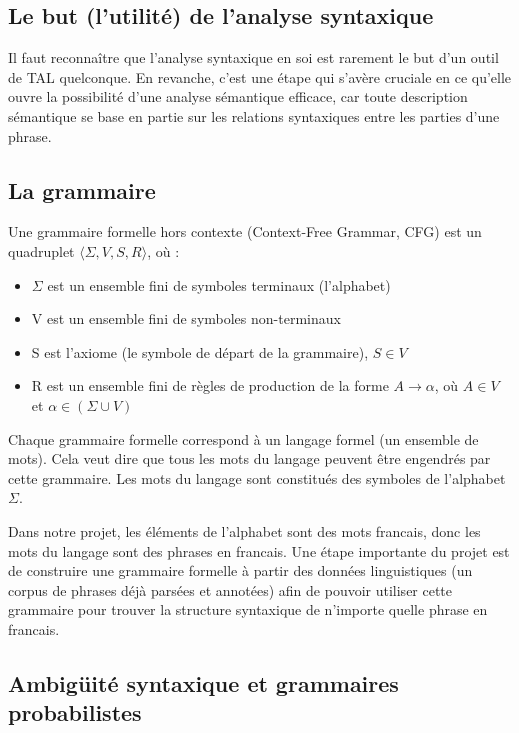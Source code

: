 \documentclass[12pt]{article}
\begin{document}
\subsection{Le but (l'utilit\'e) de l'analyse syntaxique}

Il faut reconna\^itre que l'analyse syntaxique en soi est rarement le but d'un
outil de TAL quelconque. En revanche, c'est une \'etape qui s'av\`ere cruciale en ce qu'elle ouvre la possibilit\'e d'une analyse s\'emantique efficace, car toute description
s\'emantique se base en partie sur les relations syntaxiques entre les parties d'une
phrase.

\subsection{La grammaire}

Une grammaire formelle hors contexte (Context-Free Grammar, CFG) est un
quadruplet $\langle \Sigma, V, S, R \rangle$, o\`u :
\begin{itemize}
\item $\Sigma$ est un ensemble fini de symboles terminaux (l'alphabet)
\item V est un ensemble fini de symboles non-terminaux
\item S est l'axiome (le symbole de d\'epart de la grammaire), $S \in V$
\item R est un ensemble fini de r\`egles de production de la forme $A
\rightarrow \alpha$, o\`u $A \in V$ et $\alpha \in (\Sigma \cup V)$
\end{itemize}

Chaque grammaire formelle correspond \`a un langage formel (un ensemble de mots).
Cela veut dire que tous les mots du langage peuvent \^etre engendr\'es par cette
grammaire. Les mots du langage sont constitu\'es des symboles de l'alphabet
$\Sigma$.\par

Dans notre projet, les \'el\'ements de l'alphabet sont des mots francais, donc les
mots du langage sont des phrases en francais. Une \'etape importante du projet est de construire
une grammaire formelle \`a partir des donn\'ees linguistiques (un corpus de phrases
d\'ej\`a pars\'ees et annot\'ees) afin de pouvoir utiliser cette grammaire pour trouver
la structure syntaxique de n'importe quelle phrase en francais.

\subsection{Ambig\"uit\'e syntaxique et grammaires probabilistes}
\end{document}
